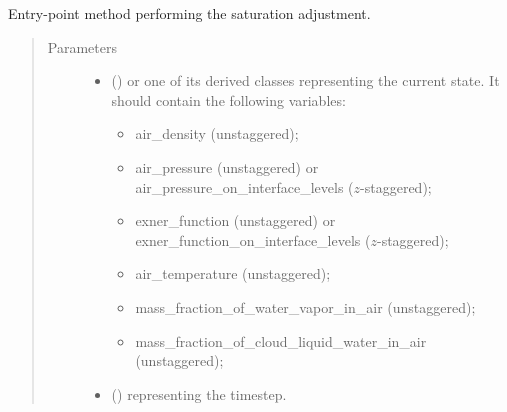 \documentclass[letterpaper,10pt,english]{sphinxmanual}
\begin{document}
\begin{fulllineitems}
\begin{quote}
\begin{description}
\begin{itemize}
\end{itemize}

\end{description}\end{quote}

\begin{fulllineitems}
\label{\detokenize{api:tasmania.parameterizations.adjustment_microphysics_kessler_wrf_saturation.AdjustmentMicrophysicsKesslerWRFSaturation.__call__}}
Entry-point method performing the saturation adjustment.
\begin{quote}\begin{description}
\item[{Parameters}] \leavevmode\begin{itemize}
\item {} 
 () \textendash{} 
{\hyperref[\detokenize{api:tasmania.storages.grid_data.GridData}]{}} or one of its derived classes representing the current state.
It should contain the following variables:
\begin{itemize}
\item {} 
air\_density (unstaggered);

\item {} 
air\_pressure (unstaggered) or air\_pressure\_on\_interface\_levels (\(z\)-staggered);

\item {} 
exner\_function (unstaggered) or exner\_function\_on\_interface\_levels (\(z\)-staggered);

\item {} 
air\_temperature (unstaggered);

\item {} 
mass\_fraction\_of\_water\_vapor\_in\_air (unstaggered);

\item {} 
mass\_fraction\_of\_cloud\_liquid\_water\_in\_air (unstaggered);

\end{itemize}


\item {} 
 () \textendash{}  representing the timestep.


\end{itemize}
\end{description}
\end{quote}
\end{fulllineitems}
\end{fulllineitems}
\end{document}
